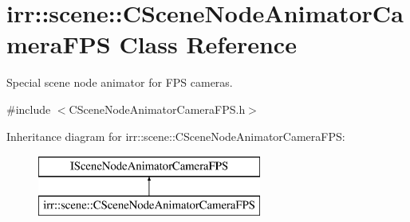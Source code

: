 \hypertarget{classirr_1_1scene_1_1_c_scene_node_animator_camera_f_p_s}{\section{irr\-:\-:scene\-:\-:C\-Scene\-Node\-Animator\-Camera\-F\-P\-S Class Reference}
\label{classirr_1_1scene_1_1_c_scene_node_animator_camera_f_p_s}
}


Special scene node animator for F\-P\-S cameras.  




{\ttfamily \#include $<$C\-Scene\-Node\-Animator\-Camera\-F\-P\-S.\-h$>$}

Inheritance diagram for irr\-:\-:scene\-:\-:C\-Scene\-Node\-Animator\-Camera\-F\-P\-S\-:\begin{figure}[H]
\begin{center}
\leavevmode
\includegraphics[height=2.000000cm]{classirr_1_1scene_1_1_c_scene_node_animator_camera_f_p_s}
\end{center}
\end{figure}
